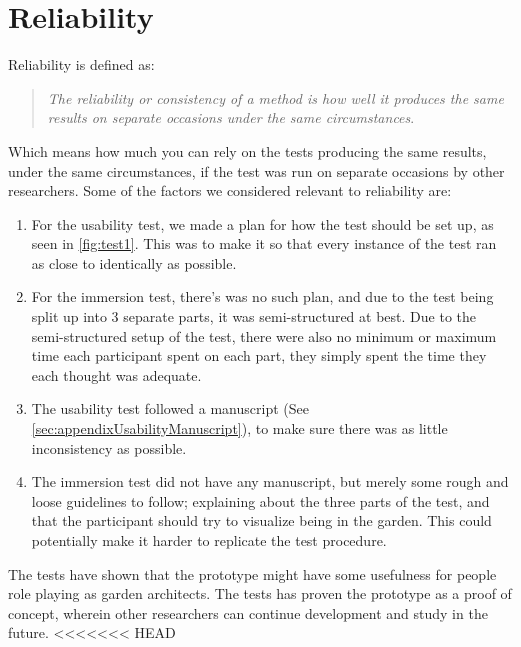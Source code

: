 \section*{Reliability}
	Reliability is defined as:\\
	\begin{quote}
		\textit{The reliability or consistency of a method is how well it produces the same results on separate occasions under the same circumstances}\cite[p.~442~Box~13.3]{interactionDesign}.\\
	\end{quote}
	Which means how much you can rely on the tests producing the same results, under the same circumstances, if the test was run on separate occasions by other researchers. Some of the factors we considered relevant to reliability are:\\
	\begin{enumerate}
		\item For the usability test, we made a plan for how the test should be set up, as seen in \autoref{fig:test1}. This was to make it so that every instance of the test ran as close to identically as possible.\\
		
		\item For the immersion test, there's was no such plan, and due to the test being split up into 3 separate parts, it was semi-structured at best. Due to the semi-structured setup of the test, there were also no minimum or maximum time each participant spent on each part, they simply spent the time they each thought was adequate.\\
		
		\item The usability test followed a manuscript (See \autoref{sec:appendixUsabilityManuscript}), to make sure there was as little inconsistency as possible.\\
		
		\item The immersion test did not have any manuscript, but merely some rough and loose guidelines to follow; explaining about the three parts of the test, and that the participant should try to visualize being in the garden. This could potentially make it harder to replicate the test procedure.\\
	\end{enumerate}
	The tests have shown that the prototype might have some usefulness for people role playing as garden architects. The tests has proven the prototype as a proof of concept, wherein other researchers can continue development and study in the future.
<<<<<<< HEAD
	

